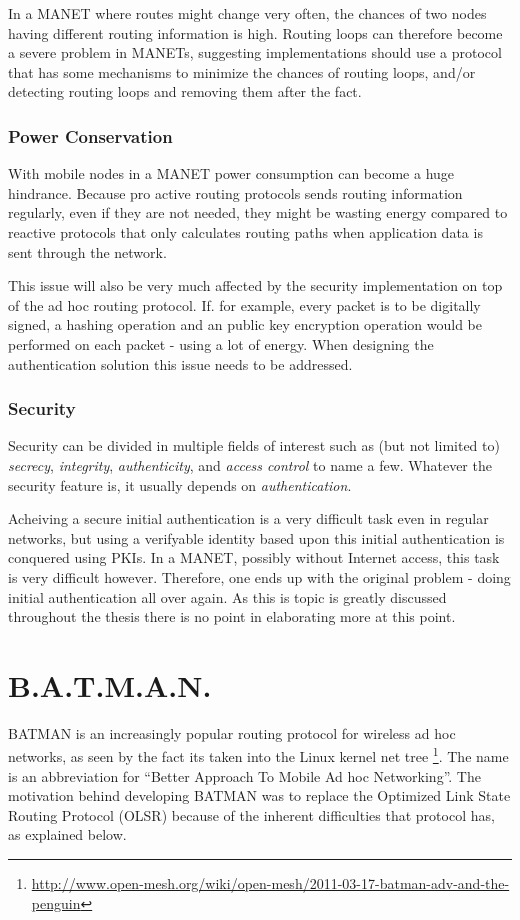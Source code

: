 In a \ac{MANET} where routes might change very often, the chances of two nodes
having different routing information is high. Routing loops can therefore become
a severe problem in \acp{MANET}, suggesting implementations should use a
protocol that has some mechanisms to minimize the chances of routing loops,
and/or detecting routing loops and removing them after the fact.

\subsubsection*{Power Conservation}
With mobile nodes in a \ac{MANET} power consumption can become a huge hindrance.
Because pro active routing protocols sends routing information regularly, even
if they are not needed, they might be wasting energy compared to reactive
protocols that only calculates routing paths when application data is sent
through the network.

This issue will also be very much affected by the security implementation on top
of the ad hoc routing protocol. If. for example, every packet is to be digitally
signed, a hashing operation and an public key encryption operation would be
performed on each packet - using a lot of energy. When designing the
authentication solution this issue needs to be addressed.

\subsubsection*{Security}
Security can be divided in multiple fields of interest such as (but not limited
to) \textit{secrecy}, \textit{integrity}, \textit{authenticity}, and
\textit{access control} to name a few. Whatever the security feature is, it
usually depends on \emph{authentication}.

Acheiving a secure initial authentication is a very difficult task even in
regular networks, but using a verifyable identity based upon this initial
authentication is conquered using \acp{PKI}. In a \ac{MANET}, possibly without
Internet access, this task is very difficult however. Therefore, one ends up
with the original problem - doing initial authentication all over again. As this
is topic is greatly discussed throughout the thesis there is no point in
elaborating more at this point.

\section{B.A.T.M.A.N.}
BATMAN \cite{batman_rfc} is an increasingly popular routing protocol for
wireless ad hoc networks, as seen by the fact its taken into the Linux kernel
net tree
\footnote{\url{http://www.open-mesh.org/wiki/open-mesh/2011-03-17-batman-adv-and-the-penguin}}. The name is an abbreviation for ``Better Approach To Mobile Ad hoc Networking''. The motivation behind developing BATMAN was to replace the Optimized Link State
Routing Protocol (OLSR) \cite{why-starting-batman} because of the inherent
difficulties that protocol has, as explained below.

